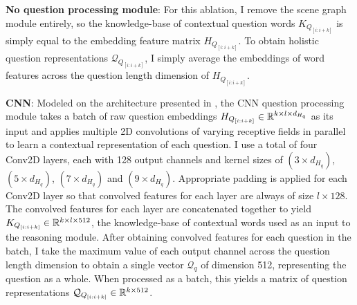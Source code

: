 \textbf{No question processing module}: For this ablation, I remove the scene graph module entirely, so the knowledge-base of contextual question words \(K_{Q_{[i:i+k]}}\) is simply equal to the embedding feature matrix \(H_{Q_{[i:i+k]}}\). To obtain holistic question representations \(\mathcal{Q}_{Q_{[i:i+k]}}\), I simply average the embeddings of word features across the question length dimension of \(H_{Q_{[i:i+k]}}\).

\textbf{CNN}: Modeled on the architecture presented in \cite{kim2014convolutional}, the CNN question processing module takes a batch of raw question embeddings \(H_{Q_{[i:i+k]}} \in \mathbb{R}^{k \times l \times d_{H_q}}\) as its input and applies multiple 2D convolutions of varying receptive fields in parallel to learn a contextual representation of each question. I use a total of four Conv2D layers, each with 128 output channels and kernel sizes of \((3 \times d_{H_q})\), \((5 \times d_{H_q})\), \((7 \times d_{H_q})\) and \((9 \times d_{H_q})\). Appropriate padding is applied for each Conv2D layer so that convolved features for each layer are always of size \(l \times 128\). The convolved features for each layer are concatenated together to yield \(K_{Q_{[i:i+k]}} \in \mathbb{R}^{k \times l \times 512}\), the knowledge-base of contextual words used as an input to the reasoning module. After obtaining convolved features for each question in the batch, I take the maximum value of each output channel across the question length dimension to obtain a single vector \(\mathcal{Q}_q\) of dimension 512, representing the question as a whole. When processed as a batch, this yields a matrix of question representations \(\mathcal{Q}_{Q_{[i:i+k]} } \in \mathbb{R}^{k \times 512}\).

